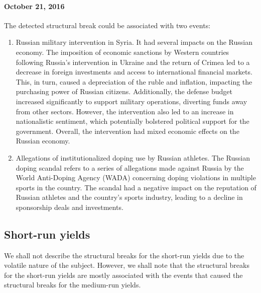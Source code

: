             \paragraph{October 21, 2016} The detected structural break could be associated with two events:
            \begin{enumerate}
                \item Russian military intervention in Syria. It had several impacts on the Russian economy. The imposition of economic 
                sanctions by Western countries following Russia's intervention in Ukraine and the return of Crimea led to a decrease 
                in foreign investments and access to international financial markets. This, in turn, caused a depreciation of the ruble 
                and inflation, impacting the purchasing power of Russian citizens. Additionally, the defense budget increased significantly 
                to support military operations, diverting funds away from other sectors. However, the intervention also led to an increase 
                in nationalistic sentiment, which potentially bolstered political support for the government. Overall, the intervention 
                had mixed economic effects on the Russian economy.
                \item Allegations of institutionalized doping use by Russian athletes. The Russian doping scandal refers to a series of 
                allegations made against Russia by the World Anti-Doping Agency (WADA) concerning doping violations in multiple sports 
                in the country. The scandal had a negative impact on the reputation of Russian athletes and the country's sports industry, 
                leading to a decline in sponsorship deals and investments.
            \end{enumerate}

    \subsection{Short-run yields}
        We shall not describe the structural breaks for the short-run yields due to the volatile nature of the subject. However, we shall 
        note that the structural breaks for the short-run yields are mostly associated with the events that caused the structural breaks 
        for the medium-run yields.

